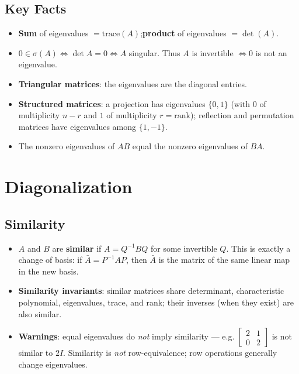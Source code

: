 \documentclass[hidelinks]{article}
\begin{document}
\subsection{Key Facts}
\begin{itemize}
    \item \textbf{Sum} of eigenvalues $= \mathrm{trace}(A)$;\quad \textbf{product} of eigenvalues $= \det(A)$.
    \item $0\in\sigma(A) \iff \det A = 0 \iff A$ singular. Thus $A$ is invertible $\iff 0$ is not an eigenvalue.
    \item \textbf{Triangular matrices}: the eigenvalues are the diagonal entries.
    \item \textbf{Structured matrices}: a projection has eigenvalues $\{0,1\}$ (with $0$ of multiplicity $n-r$ and $1$ of multiplicity $r=\mathrm{rank}$); reflection and permutation matrices have eigenvalues among $\{1,-1\}$.
    \item The nonzero eigenvalues of $AB$ equal the nonzero eigenvalues of $BA$.
\end{itemize}

\section{Diagonalization}

\subsection{Similarity}
\begin{itemize}
    \item $A$ and $B$ are \textbf{similar} if $A = Q^{-1}BQ$ for some invertible $Q$. This is exactly a change of basis: if $\bar A = P^{-1}AP$, then $\bar A$ is the matrix of the same linear map in the new basis.
    \item \textbf{Similarity invariants}: similar matrices share determinant, characteristic polynomial, eigenvalues, trace, and rank; their inverses (when they exist) are also similar.
    \item \textbf{Warnings}: equal eigenvalues do \emph{not} imply similarity — e.g. $\begin{bmatrix}2&1\\0&2\end{bmatrix}$ is not similar to $2I$. Similarity is \emph{not} row-equivalence; row operations generally change eigenvalues.
\end{itemize}
\end{document}
